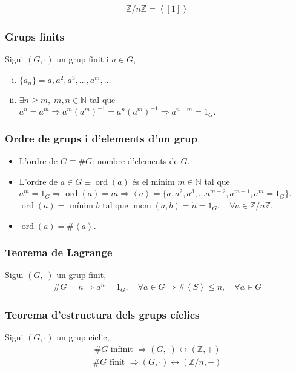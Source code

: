 \begin{example}
\begin{align*}
    \mathbb{Z} / n \mathbb{Z} = \left< [1] \right>
\end{align*}
\end{example}

\subsubsection*{Grups finits}
Sigui $( G , \cdot )$ un grup finit i $a \in G$,
\begin{enumerate}[i)]
    \item $\{ a_{n} \} = a, a^{2}, a^{3}, \dots , a^{m}, \dots$
    \item $\exists n \geq m, \; m,n \in \mathbb{N} $ tal que $a^{n} = a^{m} \Rightarrow a^{m} (a^{m})^{-1} = a^{n} (a^{m})^{-1} \Rightarrow a^{n-m} = 1_{G}$.
\end{enumerate}
\subsubsection*{Ordre de grups i d'elements d'un grup}
\begin{itemize}
    \item L'ordre de $G \equiv \# G$: nombre d'elements de $G$.
    \item L'ordre de $a \in G \equiv \operatorname{ord}(a) $ és el mínim $m \in \mathbb{N}$ tal que $a^{m} = 1_{G} \Rightarrow \operatorname{ord} (a) = m \Rightarrow \left< a \right> = \{a, a^{2}, a^{3}, \dots a^{m-2}, a^{m-1}, a^{m} = 1_{G} \} $. $\operatorname{ord} (a) = \text{ mínim } b \text{ tal que } \operatorname{mcm} (a,b) = \dot{n} = 1_{G}, \quad \forall a \in \mathbb{Z} / n\mathbb{Z}$.
    \item $\operatorname{ord} (a) = \# \left< a \right>$.
\end{itemize}

\subsubsection*{Teorema de Lagrange}
Sigui $( G , \cdot )$ un grup finit,
\begin{align}
\# G = n \Rightarrow a^{n} = 1_{G}, \quad \forall a \in G \Rightarrow \# \left< S \right> \leq n, \quad \forall a \in G
\end{align}

\subsubsection*{Teorema d'estructura dels grups cíclics}
Sigui $( G , \cdot )$ un grup cíclic,
\begin{align}
\# G \textrm{ infinit } \Rightarrow ( G , \cdot ) \leftrightarrow (\mathbb{Z} , + )
\end{align}
\begin{align}
\# G \textrm{ finit } \Rightarrow ( G , \cdot ) \leftrightarrow (\mathbb{Z} / n , + )
\end{align}

